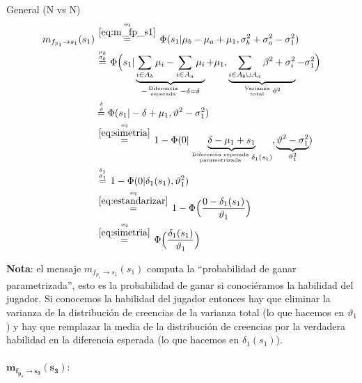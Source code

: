 \documentclass[article]{jss}
\newcommand\hfrac[2]{\genfrac{}{}{0pt}{}{#1}{#2}} %
\begin{document}
\begin{appendix}
General (N vs N)
\begin{equation}\label{eq:m_fp_s1_gral}
\begin{split}
m_{f_{p_1} \rightarrow s_1}(s_1) & \overset{\hfrac{\text{eq}}{\ref{eq:m_fp_s1}}}{=} \Phi(s_1| \mu_b - \mu_a + \mu_1, \sigma_b^2 +\sigma_a^2 - \sigma_1^2 )  \\
& \overset{\hfrac{\mu_b}{\sigma_b}}{=} \Phi\Big(s_1| \underbrace{\sum_{i \in A_b} \mu_i - \sum_{i \in A_a} \mu_i }_{-\hfrac{\text{Diferencia}}{\text{esperada}} \, -\delta = \delta } + \mu_1 , \underbrace{\sum_{i \in A_b \cup A_a} \beta^2 + \sigma_i^2}_{\hfrac{\text{Varianza}}{\text{total}} \, \vartheta^2} - \sigma_1^2   \Big) \\
& \overset{\hfrac{\delta}{\vartheta}}{=} \Phi(s_1|-\delta + \mu_1,\vartheta^2-\sigma_1^2) \\
& \overset{\hfrac{\text{eq}}{\ref{eq:simetria}}}{=} 1- \Phi(0| \underbrace{\delta - \mu_1 + s_1}_{\hfrac{\text{Diferencia esperada}}{\text{parametrizada}} \, \delta_1(s_1)},\underbrace{\vartheta^2-\sigma_1^2}_{\vartheta_1^2}) \\
& \overset{\hfrac{\delta_1}{\vartheta_1}}{=} 1- \Phi(0|\delta_1(s_1),\vartheta_1^2) \\
&\overset{\hfrac{\text{eq}}{\ref{eq:estandarizar}}}{=} 1- \Phi\Big(\frac{0-\delta_1(s_1)}{\vartheta_1}\Big)\\
&\overset{\hfrac{\text{eq}}{\ref{eq:simetria}}}{=} \Phi\Big(\frac{\delta_1(s_1)}{\vartheta_1}\Big)
\end{split}
\end{equation}

\textbf{Nota}: el mensaje $m_{f_{p_1} \rightarrow s_1}(s_1)$ computa la ``probabilidad de ganar parametrizada'', esto es la probabilidad de ganar si conoci\'eramos la habilidad del jugador. Si conocemos la habilidad del jugador entonces hay que eliminar la varianza de la distribuci\'on de creencias de la varianza total (lo que hacemos en $\vartheta_1$) y hay que remplazar la media de la distribuci\'on de creencias por la verdadera habilidad en la diferencia esperada (lo que hacemos en $\delta_1(s_1)$).

\paragraph{$\bm{m_{f_{p_3} \rightarrow s_3}(s_3)}:$}


\end{appendix}
\end{document}
